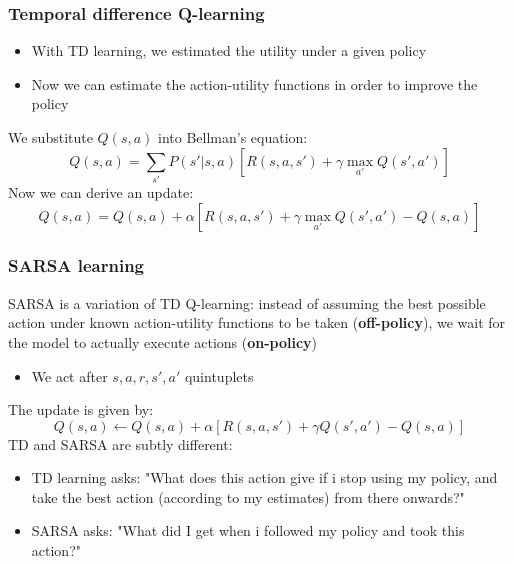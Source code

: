 \documentclass{beamer}
\begin{document}
\begin{frame}
	\frametitle{Temporal difference Q-learning}
	\begin{itemize}
		\item<1-> With TD learning, we estimated the utility under a given policy
		\item<2-> Now we can estimate the action-utility functions in order to improve the policy
	\end{itemize}
	\pause
	\pause
	We substitute $Q(s,a)$ into Bellman's equation:
	$$
		Q(s, a) = \sum_{s'} P(s' | s, a) \left[ R(s, a, s') + \gamma \max_{a'} Q(s', a') \right]
	$$
	Now we can derive an update:
	$$
	Q(s, a) = Q(s, a) + \alpha \left[ R(s, a, s') + \gamma \max_{a'} Q(s', a') - Q(s, a) \right]
	$$
\end{frame}

\begin{frame}
	\frametitle{SARSA learning}
	SARSA is a variation of TD Q-learning: instead of assuming the best possible action under known action-utility functions to be taken (\textbf{off-policy}), we wait for the model to actually execute actions (\textbf{on-policy})
	\begin{itemize}
		\item We act after $s, a, r, s', a'$ quintuplets
	\end{itemize}
	The update is given by:
	$$
		Q(s, a) \leftarrow Q(s, a) + \alpha \left[ R(s, a, s') + \gamma Q(s', a') - Q(s, a) \right]
	$$
	\pause
	TD and SARSA are subtly different:
	\begin{itemize}
		\item TD learning asks: "What does this action give if i stop using my policy, and take the best action (according to my estimates) from there onwards?"
		\item SARSA asks: "What did I get when i followed my policy and took this action?" 
	\end{itemize}
\end{frame}
\end{document}
